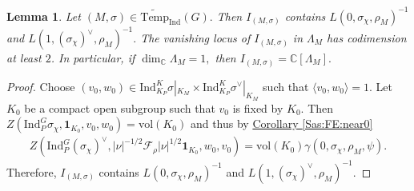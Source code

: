 \documentclass[10pt]{amsart}
\newtheorem{lemma}[theorem]{Lemma}
\theoremstyle{definition}
\numberwithin{equation}{section}
\numberwithin{equation}{subsection}
\newcommand{\Ind}{\mathrm{Ind}}
\newcommand{\CC}{\mathbb{C}}
\newcommand{\Temp}{\mathrm{Temp}}
\begin{document}
\begin{lemma}\label{lem:naivegen}
    Let $(M,\sigma)\in \widetilde{\Temp}_\Ind(G).$ Then $I_{(M,\sigma)}$ contains $L(0,\sigma_\chi,\rho_M)^{-1}$ and  $L(1,(\sigma_{\chi})^\lor,\rho_M)^{-1}.$ The vanishing locus of $I_{(M,\sigma)}$ in $\Lambda_M$ has codimension at least $2$. In particular, if $\dim_\CC\Lambda_M=1,$ then $I_{(M,\sigma)}=\CC[\Lambda_M].$
\end{lemma}

\begin{proof}
     Choose $(v_0,w_0)\in \Ind_{K_P}^K \sigma|_{K_M}\times \Ind_{K_P}^K \sigma^\lor|_{K_M}$ such that $\langle v_0,w_0\rangle=1.$ Let $K_0$ be a compact open subgroup such that $v_0$ is fixed by $K_0.$ Then $Z(\mathrm{Ind}_P^G \sigma_\chi,\mathbf{1}_{K_0},v_0,w_0)=\mathrm{vol}(K_0)$ and thus by \hyperref[Sas:FE:near0]{Corollary \ref{Sas:FE:near0}}
    \begin{align*}
        Z(\mathrm{Ind}_P^G (\sigma_\chi)^\lor,|\nu|^{-1/2}\mathcal{F}_\rho |\nu|^{1/2}\mathbf{1}_{K_0},w_0,v_0)=\mathrm{vol}(K_0)\gamma(0,\sigma_\chi,\rho_M,\psi).
    \end{align*}
    Therefore, $I_{(M,\sigma)}$ contains $L(0,\sigma_\chi,\rho_M)^{-1}$ and  $L(1,(\sigma_{\chi})^\lor,\rho_M)^{-1}$. 
    

\end{proof}
\end{document}
